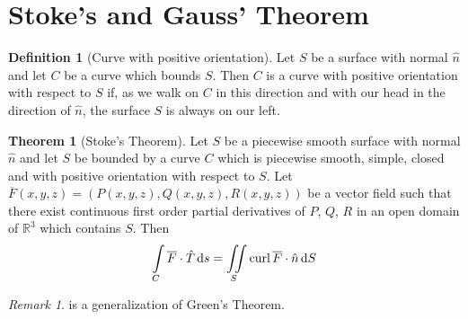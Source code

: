 \documentclass[fleqn, a4paper, 12pt]{article}
\newcommand{\curl}{\mathrm{curl\,}}
\theoremstyle{definition}
\newtheorem{definition}{Definition}
\theoremstyle{theorem}
\newtheorem{theorem}{Theorem}
\theoremstyle{remark}
\newtheorem{remark}{Remark}
\begin{document}
\section{Stoke's and Gauss' Theorem}

\begin{definition}[Curve with positive orientation]
	Let $S$ be a surface with normal $\hat{n}$ and let $C$ be a curve which bounds $S$. Then $C$ is a curve with positive orientation with respect to $S$ if, as we walk on $C$ in this direction and with our head in the direction of $\hat{n}$, the surface $S$ is always on our left.
\end{definition}

\begin{theorem}[Stoke's Theorem]
	Let $S$ be a piecewise smooth surface with normal $\hat{n}$ and let $S$ be bounded by a curve $C$ which is piecewise smooth, simple, closed and with positive orientation with respect to $S$. Let $\overline{F}(x,y,z) = \left( P(x,y,z), Q(x,y,z), R(x,y,z) \right)$ be a vector field such that there exist continuous first order partial derivatives of $P$, $Q$, $R$ in an open domain of $\mathbb{R}^3$ which contains $S$. Then 
	\begin{equation*}
		\int\limits_{C} \overline{F} \cdot \hat{T} \dif s = \iint\limits_{S} \curl \overline{F} \cdot \hat{n} \dif S
	\end{equation*}
	\label{Stoke's Theorem}
\end{theorem}

\begin{remark}
	 is a generalization of Green's Theorem.
\end{remark}
\end{document}
